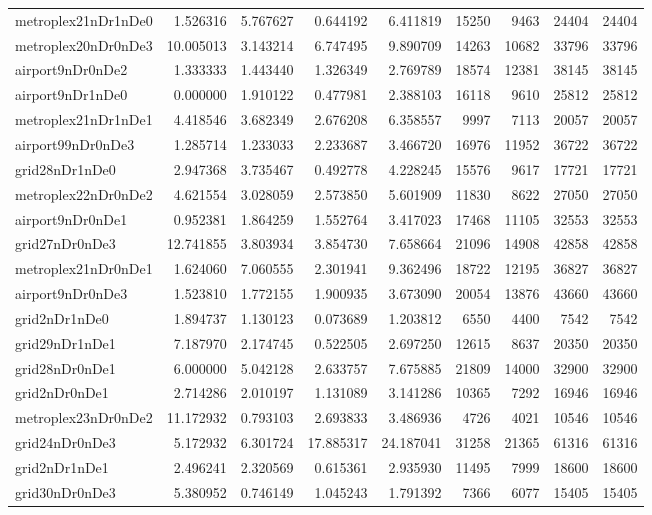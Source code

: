 \begin{longtable}{|l|r|r|r|r|r|r|r|r|}
metroplex21nDr1nDe0 & 1.526316 & 5.767627 & 0.644192 & 6.411819 & 15250 & 9463 & 24404 & 24404 \\
metroplex20nDr0nDe3 & 10.005013 & 3.143214 & 6.747495 & 9.890709 & 14263 & 10682 & 33796 & 33796 \\
airport9nDr0nDe2 & 1.333333 & 1.443440 & 1.326349 & 2.769789 & 18574 & 12381 & 38145 & 38145 \\
airport9nDr1nDe0 & 0.000000 & 1.910122 & 0.477981 & 2.388103 & 16118 & 9610 & 25812 & 25812 \\
metroplex21nDr1nDe1 & 4.418546 & 3.682349 & 2.676208 & 6.358557 & 9997 & 7113 & 20057 & 20057 \\
airport99nDr0nDe3 & 1.285714 & 1.233033 & 2.233687 & 3.466720 & 16976 & 11952 & 36722 & 36722 \\
grid28nDr1nDe0 & 2.947368 & 3.735467 & 0.492778 & 4.228245 & 15576 & 9617 & 17721 & 17721 \\
metroplex22nDr0nDe2 & 4.621554 & 3.028059 & 2.573850 & 5.601909 & 11830 & 8622 & 27050 & 27050 \\
airport9nDr0nDe1 & 0.952381 & 1.864259 & 1.552764 & 3.417023 & 17468 & 11105 & 32553 & 32553 \\
grid27nDr0nDe3 & 12.741855 & 3.803934 & 3.854730 & 7.658664 & 21096 & 14908 & 42858 & 42858 \\
metroplex21nDr0nDe1 & 1.624060 & 7.060555 & 2.301941 & 9.362496 & 18722 & 12195 & 36827 & 36827 \\
airport9nDr0nDe3 & 1.523810 & 1.772155 & 1.900935 & 3.673090 & 20054 & 13876 & 43660 & 43660 \\
grid2nDr1nDe0 & 1.894737 & 1.130123 & 0.073689 & 1.203812 & 6550 & 4400 & 7542 & 7542 \\
grid29nDr1nDe1 & 7.187970 & 2.174745 & 0.522505 & 2.697250 & 12615 & 8637 & 20350 & 20350 \\
grid28nDr0nDe1 & 6.000000 & 5.042128 & 2.633757 & 7.675885 & 21809 & 14000 & 32900 & 32900 \\
grid2nDr0nDe1 & 2.714286 & 2.010197 & 1.131089 & 3.141286 & 10365 & 7292 & 16946 & 16946 \\
metroplex23nDr0nDe2 & 11.172932 & 0.793103 & 2.693833 & 3.486936 & 4726 & 4021 & 10546 & 10546 \\
grid24nDr0nDe3 & 5.172932 & 6.301724 & 17.885317 & 24.187041 & 31258 & 21365 & 61316 & 61316 \\
grid2nDr1nDe1 & 2.496241 & 2.320569 & 0.615361 & 2.935930 & 11495 & 7999 & 18600 & 18600 \\
grid30nDr0nDe3 & 5.380952 & 0.746149 & 1.045243 & 1.791392 & 7366 & 6077 & 15405 & 15405 \\

\end{longtable}
